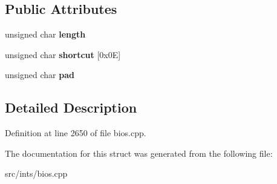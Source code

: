 \subsection*{Public Attributes}
\begin{DoxyCompactItemize}
\item 
\hypertarget{structpc98__func__key__shortcut__def_abaceed1a1548b1e78e9f5efce59e52db}{unsigned char {\bfseries length}}\label{structpc98__func__key__shortcut__def_abaceed1a1548b1e78e9f5efce59e52db}

\item 
\hypertarget{structpc98__func__key__shortcut__def_a073430a78271a50b611f35bd105253ab}{unsigned char {\bfseries shortcut} \mbox{[}0x0\-E\mbox{]}}\label{structpc98__func__key__shortcut__def_a073430a78271a50b611f35bd105253ab}

\item 
\hypertarget{structpc98__func__key__shortcut__def_a990a1f47feb6015883e885481702bd07}{unsigned char {\bfseries pad}}\label{structpc98__func__key__shortcut__def_a990a1f47feb6015883e885481702bd07}

\end{DoxyCompactItemize}


\subsection{Detailed Description}


Definition at line 2650 of file bios.\-cpp.



The documentation for this struct was generated from the following file\-:\begin{DoxyCompactItemize}
\item 
src/ints/bios.\-cpp\end{DoxyCompactItemize}
